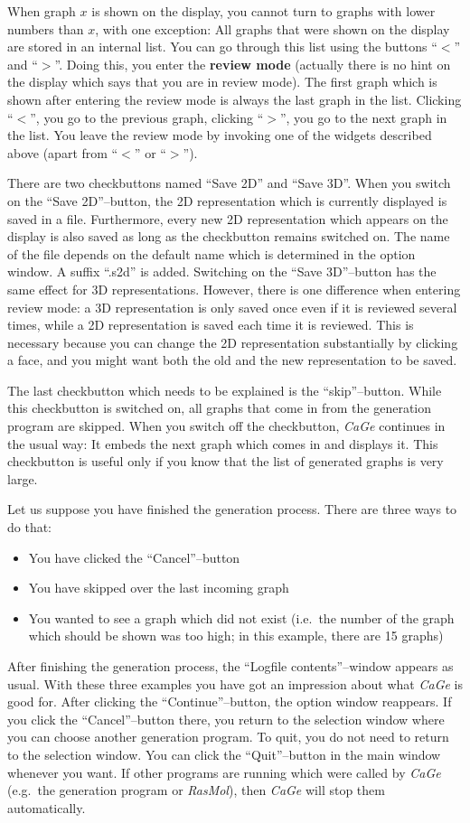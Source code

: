 \documentclass[a4paper]{article}
\def\CaGe{\textit{CaGe}}
\begin{document}
When graph $x$ is shown on the display, you cannot turn to graphs with lower 
numbers than $x$, with one exception: All graphs that were shown on the display
are stored in an internal list. You can go through this list using the buttons
``$<$'' and ``$>$''. Doing this, you enter the \textbf{review mode} (actually
there is no hint on the display which says that you are in review mode). The
first graph which is shown after entering the review mode is always the last
graph in the list. Clicking ``$<$'', you go to the previous graph, clicking
``$>$'', you go to the next graph in the list. You leave the review mode by
invoking one of the widgets described above (apart from ``$<$'' or ``$>$'').

There are two checkbuttons named ``Save 2D'' and ``Save 3D''. When you switch
on the ``Save 2D''--button, the 2D representation which is currently displayed
is saved in a file. Furthermore, every new 2D representation which appears on
the display is also saved as long as the checkbutton remains switched on. The
name of the file depends on the default name which is determined in the
option window. A suffix ``.s2d'' is added. Switching on the ``Save 3D''--button
has the same effect for 3D representations. However, there is one difference
when entering review mode: a 3D representation is only saved once even if it
is reviewed several times, while a 2D representation is saved each time it is
reviewed. This is necessary because you can change the 2D representation
substantially by clicking a face, and you might want both the old and the
new representation to be saved.

The last checkbutton which needs to be explained is the ``skip''--button.
While this checkbutton is switched on, all graphs that come in from the
generation program are skipped. When you switch off the checkbutton, \CaGe{}
continues in the usual way: It embeds the next graph which comes in and
displays it. This checkbutton is useful only if you know that the list of
generated graphs is very large.

Let us suppose you have finished the generation process. There are
three ways to do that:
\begin{itemize}
\item You have clicked the ``Cancel''--button
\item You have skipped over the last incoming graph
\item You wanted to see a graph which did not exist (i.e.~the number of
the graph which should be shown was too high; in this example, there are 15
graphs)
\end{itemize}
After finishing the generation process, the ``Logfile contents''--window
appears as usual. With these three examples you have got an impression about
what \CaGe{} is good for. After clicking the ``Continue''--button, 
the option
window reappears. If you click the ``Cancel''--button there, you return to
the selection window where you can choose another generation program. To quit,
you do not need to return to the selection window. You can click the 
``Quit''--button in the main window whenever you want. If other programs 
are running which
were called by \CaGe{} (e.g.~the generation program or
\textit{RasMol}), then \CaGe{} will stop them automatically.
\end{document}

